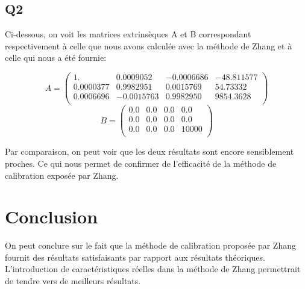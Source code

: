 \documentclass[a4paper,12pt]{report}
\begin{document}
\subsection*{Q2}
Ci-dessous, on voit les matrices extrinsèques A et B correspondant respectivement à celle que nous avons calculée avec la méthode de Zhang et à celle qui nous a été fournie:\\
\begin{center}
\[
	A=\left (
	\begin{array}{cccc}
		1.           & 0.0009052  & - 0.0006686 &  - 48.811577 \\
		0.0000377    & 0.9982951  &  0.0015769  &  54.73332   \\
		0.0006696  & - 0.0015763  &  0.9982950  &  9854.3628  \\
	\end{array}
	\right )	
\]
\[
	B=\left (
	\begin{array}{cccc}
		0.0 & 0.0 & 0.0 & 0.0    \\
		0.0 & 0.0 & 0.0 & 0.0  \\
		0.0 & 0.0 & 0.0 & 10000  \\
	\end{array}
	\right )
\]
\end{center}
Par comparaison, on peut voir que les deux résultats sont encore sensiblement proches. Ce qui nous permet de confirmer de l'efficacité de la méthode de calibration exposée par Zhang.

\section*{Conclusion}
On peut conclure sur le fait que la méthode de calibration proposée par Zhang fournit des résultats satisfaisants par rapport aux résultats théoriques. L'introduction de caractéristiques réelles dans la méthode de Zhang permettrait de tendre vers de meilleurs résultats.
\end{document}
